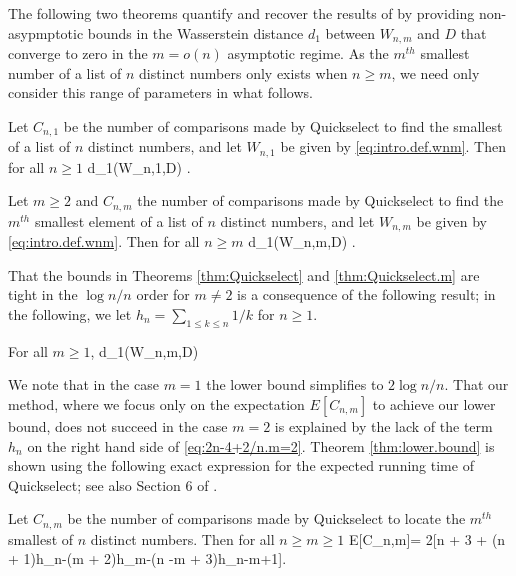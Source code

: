 \documentclass[12pt]{article}
\begin{document}
The following two theorems quantify and recover the results of \cite{MR1918722} by providing non-asypmptotic bounds in the Wasserstein distance $d_1$ between $W_{n,m}$ and $D$ that converge to zero in the $m=o(n)$ asymptotic regime. As the $m^{th}$ smallest number of a list of $n$ distinct numbers only exists when $n \ge m$, we need only consider this range of parameters in what follows. 

\begin{theorem} \label{thm:Quickselect}
	Let $C_{n,1}$ be the number of comparisons made by Quickselect to find the smallest of a list of $n$ distinct numbers, and let $W_{n,1}$ be given by \eqref{eq:intro.def.wnm}. Then for all $n \ge 1$
	\beas %
	d_1(W_{n,1},D) \le {}.
	\enas
\end{theorem}



\begin{theorem} \label{thm:Quickselect.m}
	Let $m \ge 2$ and $C_{n,m}$ the number of comparisons made by Quickselect to find the $m^{th}$ smallest element of a list of $n$ distinct numbers, and let $W_{n,m}$ be given by \eqref{eq:intro.def.wnm}. Then for all $n \ge m$
	\beas
	d_1(W_{n,m},D) \le {}.
	\enas
\end{theorem}

That the bounds in Theorems  \ref{thm:Quickselect} and \ref{thm:Quickselect.m} are tight in the $\log n/n$ order for $m \not =2$ is a consequence of the following result; in the following, we let $h_n=\sum_{1 \le k \le n}1/k$ for $n \ge 1$.

\begin{theorem} \label{thm:lower.bound}
	For all $m \ge 1$,
	\beas
	d_1(W_{n,m},D) \ge {} 
	\enas
\end{theorem}

We note that in the case $m=1$ the lower bound simplifies to $2 \log n/n$. That our method, where we focus only on the expectation $E[C_{n,m}]$ to achieve our lower bound, does not succeed in the case  $m=2$ is explained by the lack of the term $h_n$ on the right hand side of \eqref{eq:2n-4+2/n.m=2}. Theorem \ref{thm:lower.bound} is shown using the following exact expression for the expected running time of Quickselect; see also Section 6 of \cite{MR2672478}.

\begin{theorem} \label{thm:ECnm}
	Let $C_{n,m}$ be the number of comparisons made by Quickselect to locate the $m^{th}$ smallest of $n$ distinct numbers. Then for all  $n \ge m \ge 1$
	\bea \label{eq:EC.Theorem}
	E[C_{n,m}]= 2[n + 3 + (n + 1)h_n-(m + 2)h_m-(n -m + 3)h_{n-m+1}]. 
	\ena
\end{theorem}
\end{document}
